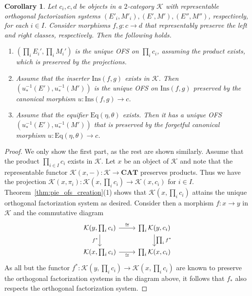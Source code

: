 \documentclass[11pt]{article}
\theoremstyle{plain}
\newtheorem{corollary}[theorem]{Corollary}
\theoremstyle{definition}
\numberwithin{equation}{section}
\newcommand{\K}{\mathcal{K}}
\newcommand{\CAT}{\mathbf{CAT}}
\newcommand{\Ins}{\mathrm{Ins}}
\newcommand{\Eq}{\mathrm{Eq}}
\begin{document}
\begin{corollary}\label{cor:pie_ofs_creation_2cat}
       Let $c_i,c,d$ be objects in a $2$-category $\K$ with representable orthogonal factorization systems $(E'_i,M'_i), (E',M'), (E'',M'')$, respectively, for each $i\in I$. Consider morphisms $f,g\colon c\to d$ that representably preserve the left and right classes, respectively. Then the following holds.
   \begin{enumerate}
       \item $(\prod_iE_i',\prod_i M_i') $ is the unique OFS on $\prod_i c_i$, assuming the product exists,  which is preserved by the projections.
       \item Assume that the inserter $\Ins(f,g)$ exists in $\K$. Then $(u_*^{-1}(E'),u_*^{-1}(M'))$ is the unique OFS on $\Ins(f,g)$ preserved by the canonical morphism $u\colon \Ins(f,g)\to c$.
       \item Assume that the equifier $\Eq(\eta,\theta)$ exists. Then it has a unique OFS $(u_*^{-1}(E'), u_*^{-1}(M'))$ that is preserved by the forgetful canonical morphism $u\colon \Eq(\eta,\theta)\to c$.
   \end{enumerate}
\end{corollary}
\begin{proof}
   We only show the first part, as the rest are shown similarly. Assume that the product $\prod_{i\in I} c_i$ exists in $\K$. Let $x$ be an object of $\K$ and note that the representable functor $\K(x,-)\colon \K\to \CAT$ preserves products. Thus we have the projection $\K(x,\pi_i)\colon \K(x,\prod_i c_i)\to \K(x,c_i)$ for $i\in I$. Theorem~\ref{thm:pie_ofs_creation}(1) shows that $\K(x,\prod_i c_i)$ attains the unique orthogonal factorization system as desired. Consider then a morphism $f\colon x\to y$ in $\K$ and the commutative diagram
   $$
   \begin{tikzcd}
{\K(y,\prod_i c_i)} \arrow[d, "f^*"'] \arrow[r, "\cong"] & {\prod_i \K(y,c_i)} \arrow[d, "{\prod_i f^*}"] \\
{\K(x,\prod_i c_i)} \arrow[r, "\cong"']                  & {\prod_i \K(x,c_i)}                                 
\end{tikzcd}
   $$
   As all but the functor $f^*\colon \K(y,\prod_i c_i)\to \K(x,\prod_i c_i)$ are known to preserve the orthogonal factorization systems in the diagram above, it follows that $f_*$ also respects the orthogonal factorization system.
\end{proof}
\end{document}
